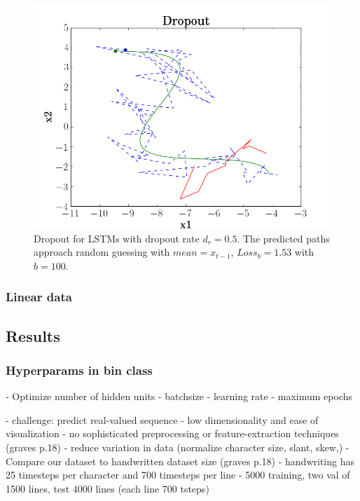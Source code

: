 \begin{figure}
	\centering
	\includegraphics [trim=0 0 0 0, clip, angle=0, width=1.0\columnwidth,
	keepaspectratio]{figures/rnn_dropout}
	\caption{Dropout for LSTMs with dropout rate $d_r = 0.5$. The predicted paths approach random guessing with $mean = x_{t-1}$, $Loss_b = 1.53$ with $b=100$.}
	\label{fig:rnn_dropout}
\end{figure}

\subsubsection{Linear data}

\subsection{Results}



\subsubsection{Hyperparams in bin class}
- Optimize number of hidden units
- batchsize
- learning rate
- maximum epochs


 


- challenge: predict real-valued sequence
- low dimensionality and ease of visualization
- no sophisticated preprocessing or feature-extraction techniques (graves p.18)
	- reduce variation in data (normalize character size, slant, skew,)
- Compare our dataset to handwritten dataset size (graves p.18)
- handwriting has 25 timesteps per character and 700 timesteps per line
- 5000 training, two val of 1500 lines, test 4000 lines (each line 700 tsteps)

